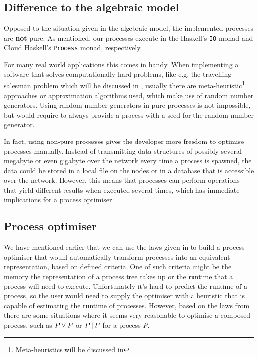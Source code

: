 \subsection{Difference to the algebraic model}
\label{chp:difference_model_implementation}
Opposed to the situation given in the algebraic model, the implemented processes are \textbf{not} pure. As mentioned, our processes execute in the \textsf{Haskell}'s \texttt{IO} monad and \textsf{Cloud Haskell}'s \texttt{Process} monad, respectively.

For many real world applications this comes in handy. When implementing a software that solves computationally hard problems, like e.g. the travelling salesman problem which will be discussed in , usually there are meta-heuristic\footnote{Meta-heuristics will be discussed in } approaches or approximation algorithms \cite{rolf2006approximationsalgorithmen} used, which make use of random number generators. Using random number generators in pure processes is not impossible, but would require to always provide a process with a seed for the random number generator.

In fact, using non-pure processes gives the developer more freedom to optimise processes manually. Instead of transmitting data structures of possibly several megabyte or even gigabyte over the network every time a process is spawned, the data could be stored in a local file on the nodes or in a database that is accessible over the network. However, this means that processes can perform operations that yield different results when executed several times, which has immediate implications for a process optimiser.

\subsection{Process optimiser}
We have mentioned earlier that we can use the laws given in  to build a process optimiser that would automatically transform processes into an equivalent representation, based on defined criteria. One of such criteria might be the memory the representation of a process tree takes up or the runtime that a process will need to execute. Unfortunately it's hard to predict the runtime of a process, so the user would need to supply the optimiser with a heuristic that is capable of estimating the runtime of processes. However, based on the laws from  there are some situations where it seems very reasonable to optimise a composed process, such as $P \vee P$ or $P \,|\, P$ for a process $P$.


